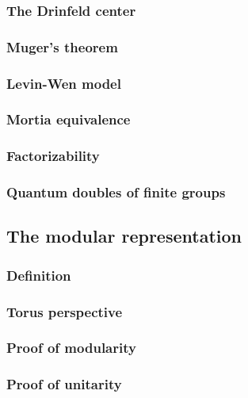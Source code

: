 \documentclass{article}
\theoremstyle{definition}
\numberwithin{figure}{section}
\begin{document}
\subsubsection{The Drinfeld center}

\subsubsection{Muger's theorem}

\subsubsection{Levin-Wen model}

\subsubsection{Mortia equivalence}

\subsubsection{Factorizability}

\subsubsection{Quantum doubles of finite groups}



\subsection{The modular representation}

\subsubsection{Definition}

\subsubsection{Torus perspective}

\subsubsection{Proof of modularity}

\subsubsection{Proof of unitarity}
\end{document}
